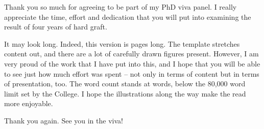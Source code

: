 
\begin{preamble}

Thank you so much for agreeing to be part of my PhD viva panel. I really appreciate the time, effort and dedication that you will put into examining the result of four years of hard graft.

It may look long. Indeed, this version is  pages long. The template stretches content out, and there are a lot of carefully drawn figures present. However, I am very proud of the work that I have put into this, and I hope that you will be able to see just how much effort was spent -- not only in terms of content but in terms of presentation, too. The word count stands at  words, below the 80,000 word limit set by the College. I hope the illustrations along the way make the read more enjoyable.

Thank you again. See you in the viva!
\end{preamble}